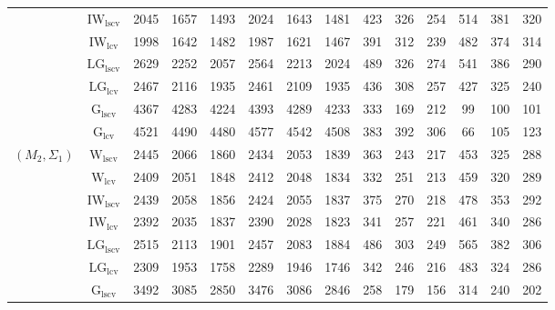 \begin{table}[!ht]
{\begin{tabular}{@{}cc|ccc|ccc|ccc|ccc@{}}
 & $\mathrm{IW}_{\mathrm{lscv}}$ & 2045 & 1657 & 1493 & 2024 & 1643 & \cellcolor{black!10}1481 & 423 & 326 & 254 & 514 & 381 & 320 \\ 
 & $\mathrm{IW}_{\mathrm{lcv}}$ & \cellcolor{black!30}1998 & \cellcolor{black!30}1642 & \cellcolor{black!30}1482 & \cellcolor{black!30}1987 & \cellcolor{black!30}1621 & \cellcolor{black!30}1467 & 391 & 312 & \cellcolor{black!10}239 & 482 & 374 & 314 \\ 
 & $\mathrm{LG}_{\mathrm{lscv}}$ & 2629 & 2252 & 2057 & 2564 & 2213 & 2024 & 489 & 326 & 274 & 541 & 386 & 290 \\ 
 & $\mathrm{LG}_{\mathrm{lcv}}$ & 2467 & 2116 & 1935 & 2461 & 2109 & 1935 & 436 & 308 & 257 & 427 & 325 & 240 \\ 
 & $\mathrm{G}_{\mathrm{lscv}}$ & 4367 & 4283 & 4224 & 4393 & 4289 & 4233 & \cellcolor{black!30}333 & \cellcolor{black!30}169 & \cellcolor{black!30}212 & \cellcolor{black!10}99 & \cellcolor{black!30}100 & \cellcolor{black!30}101 \\ 
 & $\mathrm{G}_{\mathrm{lcv}}$ & 4521 & 4490 & 4480 & 4577 & 4542 & 4508 & \cellcolor{black!10}383 & 392 & 306 & \cellcolor{black!30}66 & \cellcolor{black!10}105 & \cellcolor{black!10}123 \\ 
\midrule
$(M_2,\Sigma_1)$ & $\mathrm{W}_{\mathrm{lscv}}$ & 2445 & 2066 & 1860 & 2434 & 2053 & 1839 & 363 & \cellcolor{black!10}243 & 217 & 453 & 325 & 288 \\ 
 & $\mathrm{W}_{\mathrm{lcv}}$ & 2409 & 2051 & 1848 & 2412 & 2048 & 1834 & \cellcolor{black!10}332 & 251 & \cellcolor{black!10}213 & 459 & \cellcolor{black!10}320 & 289 \\ 
 & $\mathrm{IW}_{\mathrm{lscv}}$ & 2439 & 2058 & 1856 & 2424 & 2055 & 1837 & 375 & 270 & 218 & 478 & 353 & 292 \\ 
 & $\mathrm{IW}_{\mathrm{lcv}}$ & \cellcolor{black!10}2392 & \cellcolor{black!10}2035 & \cellcolor{black!10}1837 & \cellcolor{black!10}2390 & \cellcolor{black!10}2028 & \cellcolor{black!10}1823 & 341 & 257 & 221 & 461 & 340 & \cellcolor{black!10}286 \\ 
 & $\mathrm{LG}_{\mathrm{lscv}}$ & 2515 & 2113 & 1901 & 2457 & 2083 & 1884 & 486 & 303 & 249 & 565 & 382 & 306 \\ 
 & $\mathrm{LG}_{\mathrm{lcv}}$ & \cellcolor{black!30}2309 & \cellcolor{black!30}1953 & \cellcolor{black!30}1758 & \cellcolor{black!30}2289 & \cellcolor{black!30}1946 & \cellcolor{black!30}1746 & 342 & 246 & 216 & 483 & 324 & 286 \\ 
 & $\mathrm{G}_{\mathrm{lscv}}$ & 3492 & 3085 & 2850 & 3476 & 3086 & 2846 & \cellcolor{black!30}258 & \cellcolor{black!30}179 & \cellcolor{black!30}156 & \cellcolor{black!30}314 & \cellcolor{black!30}240 & \cellcolor{black!30}202 \\ 

\end{tabular}}
\end{table}
